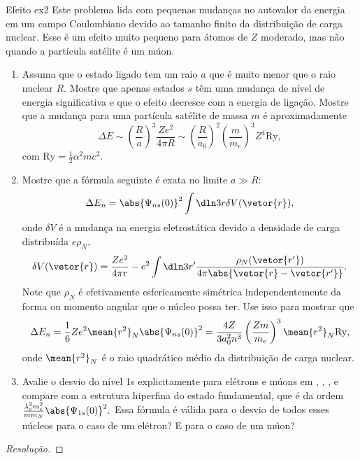 \begin{exercício}{Efeito }{ex2}
   Este problema lida com pequenas mudanças no autovalor da energia em um campo Coulombiano devido ao tamanho finito da distribuição de carga nuclear. Esse é um efeito muito pequeno para átomos de \(Z\) moderado, mas não quando a partícula satélite é um múon.
   \begin{enumerate}[label=(\alph*)]
         \item Assuma que o estado ligado tem um raio \(a\) que é muito menor que o raio nuclear \(R.\) Mostre que apenas estados \(s\) têm uma mudança de nível de energia significativa e que o efeito decresce com a energia de ligação. Mostre que a mudança para uma partícula satélite de massa \(m\) é aproximadamente
            \begin{equation*}
               \Delta E \sim \left(\frac{R}{a}\right)^3 \frac{Z e^2}{4\pi R} \sim \left(\frac{R}{a_0}\right)^2 \left(\frac{m}{m_e}\right)^3 Z^4 \mathrm{Ry},
            \end{equation*}
            com \(\mathrm{Ry} = \frac12 \alpha^2 m c^2.\)
         \item Mostre que a fórmula seguinte é exata no limite \(a \gg R\):
            \begin{equation*}
               \Delta E_n = \abs{\Psi_{ns}(0)}^2 \int \dln3r \delta V(\vetor{r}),
            \end{equation*}
            onde \(\delta V\) é a mudança na energia eletrostática devido a densidade de carga distribuída \(e \rho_N,\)
            \begin{equation*}
               \delta V(\vetor{r}) = \frac{Z e^2}{4\pi r} - e^2 \int \dln3{r'} \frac{\rho_N(\vetor{r'})}{4\pi \abs{\vetor{r} - \vetor{r'}}}.
            \end{equation*}
            Note que \(\rho_N\) é efetivamente esfericamente simétrica independentemente da forma ou momento angular que o núcleo possa ter. Use isso para mostrar que
            \begin{equation*}
               \Delta E_n = \frac16 Z e^2 \mean{r^2}_N \abs{\Psi_{ns}(0)}^2 = \frac{4 Z}{3a_0^2n^3}\left(\frac{Z m}{m_e}\right)^3 \mean{r^2}_N \mathrm{Ry},
            \end{equation*}
            onde \(\mean{r^2}_N\) é o raio quadrático médio da distribuição de carga nuclear.
         \item Avalie o desvio do nível 1s explicitamente para elétrons e múons em , , , e compare com a estrutura hiperfina do estado fundamental, que é da ordem \(\frac{\lambda_c^2 m_e^2}{mm_N}\abs{\Psi_{1s}(0)}^2.\) Essa fórmula é válida para o desvio de todos esses núcleos para o caso de um elétron? E para o caso de um múon?
   \end{enumerate}
\end{exercício}
\begin{proof}[Resolução]
    
\end{proof}
